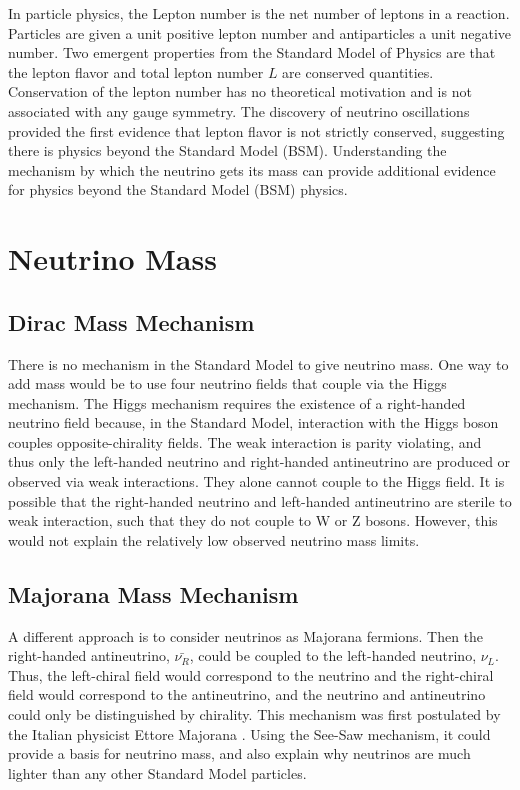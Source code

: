 


In particle physics, the Lepton number is the net number of leptons in a reaction. Particles are given a unit positive lepton number and antiparticles a unit negative number. Two emergent properties from the Standard Model of Physics are that the lepton flavor and total lepton number $L$ are conserved quantities. Conservation of the lepton number has no theoretical motivation and is not associated with any gauge symmetry. The discovery of neutrino oscillations provided the first evidence that lepton flavor is not strictly conserved, suggesting there is physics beyond the Standard Model (BSM). Understanding the mechanism by which the neutrino gets its mass can provide additional evidence for physics beyond the Standard Model (BSM) physics. 

\section{Neutrino Mass}
\subsection{Dirac Mass Mechanism}
There is no mechanism in the Standard Model to give neutrino mass. One way to add mass would be to use four neutrino fields that couple via the Higgs mechanism. The Higgs mechanism requires the existence of a right-handed neutrino field because, in the Standard Model, interaction with the Higgs boson couples opposite-chirality fields. The weak interaction is parity violating, and thus only the left-handed neutrino and right-handed antineutrino are produced or observed via weak interactions. They alone cannot couple to the Higgs field. It is possible that the right-handed neutrino and left-handed antineutrino are sterile to weak interaction, such that they do not couple to W or Z bosons. However, this would not explain the relatively low observed neutrino mass limits. 

\subsection{Majorana Mass Mechanism}
A different approach is to consider neutrinos as Majorana fermions. Then the right-handed antineutrino, $\bar{\nu_R}$, could be coupled to the left-handed neutrino, $\nu_L$. Thus, the left-chiral field would correspond to the neutrino and the right-chiral field would correspond to the antineutrino, and the neutrino and antineutrino could only be distinguished by chirality. This mechanism was first postulated by the Italian physicist Ettore Majorana \cite{Majorana_1937}. Using the See-Saw mechanism, it could provide a basis for neutrino mass, and also explain why neutrinos are much lighter than any other Standard Model particles.

